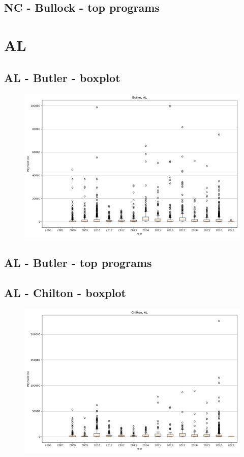 \subsection*{NC - Bullock - top programs}

\newpage
\section*{AL}
\subsection*{AL - Butler - boxplot}
\begin{figure}[h]
\centering
\includegraphics[width=7in]{../output/boxplots/counties/Butler-AL_boxplot.png}
\end{figure}


\subsection*{AL - Butler - top programs}

\newpage
\subsection*{AL - Chilton - boxplot}
\begin{figure}[h]
\centering
\includegraphics[width=7in]{../output/boxplots/counties/Chilton-AL_boxplot.png}
\end{figure}


